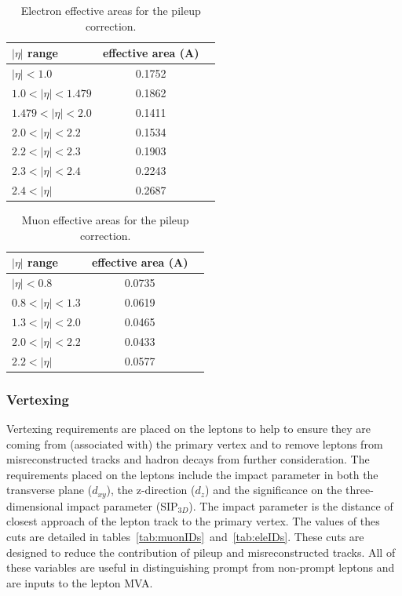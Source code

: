 \begin{table}[hbtp]
\centering
\caption[Electron effective areas for the pileup correction.]{Electron effective areas for the pileup correction.}
\begin{tabular}{lcc}
\hline
$|\eta|$ range & effective area (A) \\
\hline
$|\eta| < 1.0$ & 0.1752 \\
$1.0 < |\eta| < 1.479$ & 0.1862 \\
$1.479 < |\eta| < 2.0$ & 0.1411 \\
$2.0 < |\eta| < 2.2$ & 0.1534 \\
$2.2 < |\eta| < 2.3$ & 0.1903 \\
$2.3 < |\eta| < 2.4$ & 0.2243 \\
$2.4 < |\eta|$ & 0.2687 \\
\hline
\end{tabular}
\label{tab:ele_effArea}
\end{table}

\begin{table}[hbtp]
\centering
\caption[Muon effective areas for the pileup correction.]{Muon effective areas for the pileup correction.}
\begin{tabular}{lcc}
\hline
$|\eta|$ range & effective area (A) \\
\hline
$|\eta| < 0.8$ & 0.0735 \\
$0.8 < |\eta| < 1.3$ & 0.0619 \\
$1.3 < |\eta| < 2.0$ & 0.0465 \\
$2.0 < |\eta| < 2.2$ & 0.0433 \\
$2.2 < |\eta|$ & 0.0577 \\
\hline
\end{tabular}
\label{tab:mu_effArea}
\end{table}

\subsubsection{Vertexing}
Vertexing requirements are placed on the leptons to help to ensure they are coming from (associated with) the primary vertex and to
remove leptons from misreconstructed tracks and hadron decays from further consideration. The requirements
placed on the leptons include the impact parameter in both the transverse plane ($d_{xy}$), the z-direction ($d_{z}$) and the significance
on the three-dimensional impact parameter (SIP$_{3D}$). The impact parameter is the distance of closest approach of the lepton track to the primary vertex.
The values of thes cuts are detailed in tables~\ref{tab:muonIDs}~and~\ref{tab:eleIDs}.
These cuts are designed to reduce the contribution of pileup and misreconstructed tracks. All of these variables are useful in distinguishing prompt from non-prompt leptons
and are inputs to the lepton MVA. 


